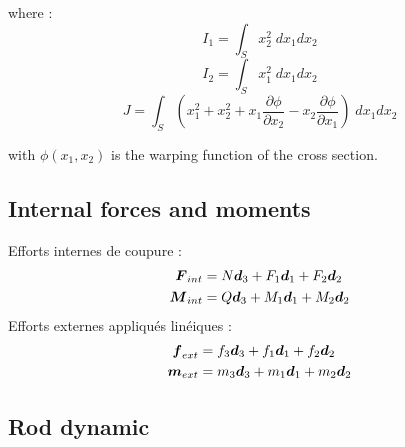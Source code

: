 where :
\begin{equation}
	I_1 = \int_S x_2^2\;dx_1 dx_2
\end{equation}
\begin{equation}
	I_2 = \int_S x_1^2\;dx_1 dx_2
\end{equation}
\begin{equation}
	J = \int_S (x_1^2+ x_2^2 + x_1 \frac{\partial \phi}{\partial x_2} - x_2 \frac{\partial \phi}{\partial x_1})\;dx_1 dx_2
\end{equation}

with $\phi(x_1, x_2)$ is the warping function of the cross section.


\subsection{Internal forces and moments}
Efforts internes de coupure :
\begin{subequations}
	\begin{align}
		\boldsymbol{F}_{int} &= N\boldsymbol{d}_3 + F_1\boldsymbol{d}_1 + F_2\boldsymbol{d}_2
		\\
		\boldsymbol{M}_{int} &= Q\boldsymbol{d}_3 + M_1\boldsymbol{d}_1 + M_2\boldsymbol{d}_2
	\end{align}
\end{subequations}
Efforts externes appliqués linéiques :
\begin{subequations}
	\begin{align}
		\boldsymbol{f}_{ext} &= f_3\boldsymbol{d}_3 + f_1\boldsymbol{d}_1 + f_2\boldsymbol{d}_2
		\\
		\boldsymbol{m}_{ext} &= m_3\boldsymbol{d}_3 + m_1\boldsymbol{d}_1 + m_2\boldsymbol{d}_2
	\end{align}
\end{subequations}

\subsection{Rod dynamic}

